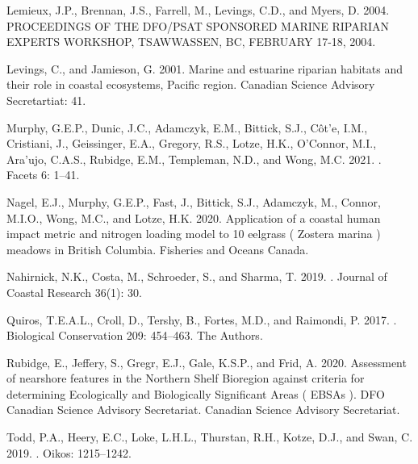 \documentclass[12pt]{article}\usepackage[]{graphicx}\usepackage[]{color}
\begin{document}
\begin{CSLReferences}{1}{0}
%
Lemieux, J.P., Brennan, J.S., Farrell, M., Levings, C.D., and Myers, D. 2004. {PROCEEDINGS OF THE DFO}/{PSAT SPONSORED MARINE RIPARIAN EXPERTS WORKSHOP}, {TSAWWASSEN}, {BC}, {FEBRUARY} 17-18, 2004.

%
Levings, C., and Jamieson, G. 2001. Marine and estuarine riparian habitats and their role in coastal ecosystems, {Pacific} region. Canadian Science Advisory Secretartiat: 41.

%
Murphy, G.E.P., Dunic, J.C., Adamczyk, E.M., Bittick, S.J., Côt'e, I.M., Cristiani, J., Geissinger, E.A., Gregory, R.S., Lotze, H.K., O'Connor, M.I., Ara'ujo, C.A.S., Rubidge, E.M., Templeman, N.D., and Wong, M.C. 2021. . Facets 6: 1--41.

%
Nagel, E.J., Murphy, G.E.P., Fast, J., Bittick, S.J., Adamczyk, M., Connor, M.I.O., Wong, M.C., and Lotze, H.K. 2020. Application of a coastal human impact metric and nitrogen loading model to 10 eelgrass ( {Zostera} marina ) meadows in {British Columbia}. {Fisheries and Oceans Canada}.

%
Nahirnick, N.K., Costa, M., Schroeder, S., and Sharma, T. 2019. . Journal of Coastal Research 36(1): 30.

%
Quiros, T.E.A.L., Croll, D., Tershy, B., Fortes, M.D., and Raimondi, P. 2017. . Biological Conservation 209: 454--463. {The Authors}.

%
Rubidge, E., Jeffery, S., Gregr, E.J., Gale, K.S.P., and Frid, A. 2020. Assessment of nearshore features in the {Northern Shelf Bioregion} against criteria for determining {Ecologically} and {Biologically Significant Areas} ( {EBSAs} ). DFO Canadian Science Advisory Secretariat. {Canadian Science Advisory Secretariat}.

%
Todd, P.A., Heery, E.C., Loke, L.H.L., Thurstan, R.H., Kotze, D.J., and Swan, C. 2019. . Oikos: 1215--1242.


\end{CSLReferences}
\end{document}
